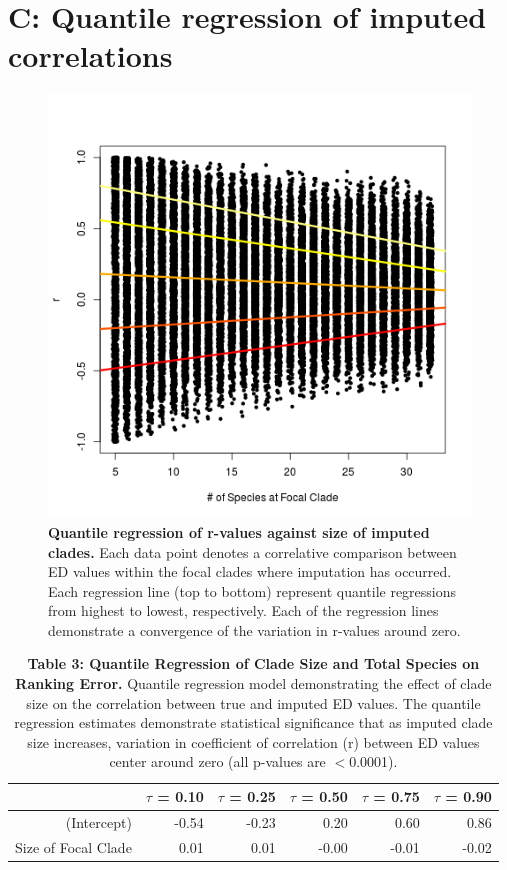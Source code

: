 \documentclass[12pt,english]{article}
\begin{document}
\clearpage
\section*{C: Quantile regression of imputed correlations}
\begin{figure}[!ht]
  \center
  \includegraphics[width=.5\textwidth]{quantModel.png}
  \caption{\textbf{Quantile regression of r-values against size of imputed
  clades.} Each data point denotes a correlative comparison between ED values
  within the focal clades where imputation has occurred. Each regression line
  (top to bottom) represent quantile regressions from highest to lowest,
  respectively. Each of the regression lines demonstrate a convergence of the
  variation in r-values around zero.}
  \label{quantReg}
\end{figure}

\begin{table}[ht]
  \centering
  \begin{tabular}{rrrrrr} \hline
  & $\tau$ = 0.10 & $\tau$ = 0.25 & $\tau$ = 0.50 & $\tau$ = 0.75 & $\tau$ = 0.90 \\\hline
  (Intercept) & -0.54 & -0.23 & 0.20 & 0.60 & 0.86 \\
    Size of Focal Clade & 0.01 & 0.01 & -0.00 & -0.01 & -0.02 \\
    \hline
    \hline
  \end{tabular}
  \caption*{\textbf{Table 3: Quantile Regression of Clade Size and Total Species
  on Ranking Error.} Quantile regression model demonstrating the effect of clade
  size on the correlation between true and imputed ED values. The quantile
  regression estimates demonstrate statistical significance that as imputed
  clade size increases, variation in coefficient of correlation (r) between ED
  values center around zero (all p-values are $<$0.0001).}
\end{table}
\end{document}

